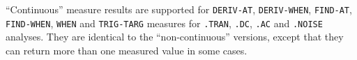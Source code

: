 

\label{Measure_CONT_section}

``Continuous'' measure results are supported for \texttt{DERIV-AT}, \texttt{DERIV-WHEN},
\texttt{FIND-AT}, \texttt{FIND-WHEN}, \texttt{WHEN} and \texttt{TRIG-TARG} measures
for \texttt{.TRAN}, \texttt{.DC}, \texttt{.AC} and \texttt{.NOISE}
analyses.  They are identical to the ``non-continuous'' versions, except that
they can return more than one measured value in some cases.


